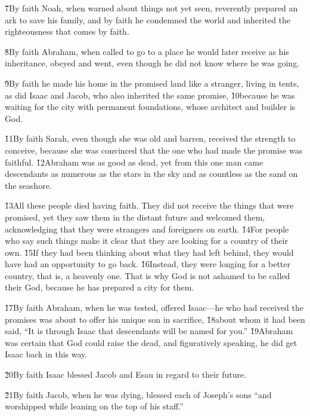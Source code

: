 \v{7}By faith Noah, when warned about things not yet seen, reverently prepared an ark to save his family, and by faith he condemned the world and inherited the righteousness that comes by faith.

\v{8}By faith Abraham, when called to go to a place he would later receive as his inheritance, obeyed and went, even though he did not know where he was going.

\v{9}By faith he made his home in the promised land like a stranger, living in tents, as did Isaac and Jacob, who also inherited the same promise, \v{10}because he was waiting for the city with permanent foundations, whose architect and builder is God.

\v{11}By faith Sarah, even though she was old and barren, received the strength to conceive, because she was convinced that the one who had made the promise was faithful. \v{12}Abraham was as good as dead, yet from this one man came descendants as numerous as the stars in the sky and as countless as the sand on the seashore.

\v{13}All these people died having faith. They did not receive the things that were promised, yet they saw them in the distant future and welcomed them, acknowledging that they were strangers and foreigners on earth. \v{14}For people who say such things make it clear that they are looking for a country of their own. \v{15}If they had been thinking about what they had left behind, they would have had an opportunity to go back. \v{16}Instead, they were longing for a better country, that is, a heavenly one. That is why God is not ashamed to be called their God, because he has prepared a city for them.

\v{17}By faith Abraham, when he was tested, offered Isaac---he who had received the promises was about to offer his unique son in sacrifice, \v{18}about whom it had been said, ``It is through Isaac that descendants will be named for you.'' \v{19}Abraham was certain that God could raise the dead, and figuratively speaking, he did get Isaac back in this way.

\v{20}By faith Isaac blessed Jacob and Esau in regard to their future.

\v{21}By faith Jacob, when he was dying, blessed each of Joseph's sons ``and worshipped while leaning on the top of his staff.''


